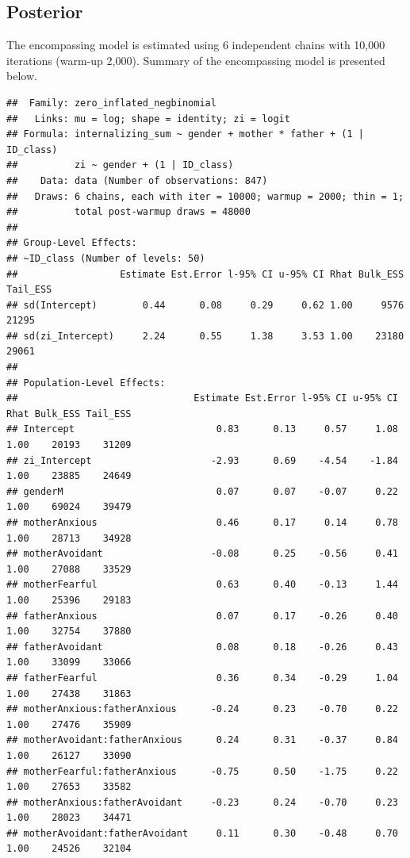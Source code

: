 \documentclass[
]{book}
\begin{document}
\hypertarget{posterior-1}{%
\subsection{Posterior}\label{posterior-1}}

The encompassing model is estimated using 6 independent chains with 10,000 iterations (warm-up 2,000). Summary of the encompassing model is presented below.

\begin{verbatim}
##  Family: zero_inflated_negbinomial 
##   Links: mu = log; shape = identity; zi = logit 
## Formula: internalizing_sum ~ gender + mother * father + (1 | ID_class) 
##          zi ~ gender + (1 | ID_class)
##    Data: data (Number of observations: 847) 
##   Draws: 6 chains, each with iter = 10000; warmup = 2000; thin = 1;
##          total post-warmup draws = 48000
## 
## Group-Level Effects: 
## ~ID_class (Number of levels: 50) 
##                  Estimate Est.Error l-95% CI u-95% CI Rhat Bulk_ESS Tail_ESS
## sd(Intercept)        0.44      0.08     0.29     0.62 1.00     9576    21295
## sd(zi_Intercept)     2.24      0.55     1.38     3.53 1.00    23180    29061
## 
## Population-Level Effects: 
##                               Estimate Est.Error l-95% CI u-95% CI Rhat Bulk_ESS Tail_ESS
## Intercept                         0.83      0.13     0.57     1.08 1.00    20193    31209
## zi_Intercept                     -2.93      0.69    -4.54    -1.84 1.00    23885    24649
## genderM                           0.07      0.07    -0.07     0.22 1.00    69024    39479
## motherAnxious                     0.46      0.17     0.14     0.78 1.00    28713    34928
## motherAvoidant                   -0.08      0.25    -0.56     0.41 1.00    27088    33529
## motherFearful                     0.63      0.40    -0.13     1.44 1.00    25396    29183
## fatherAnxious                     0.07      0.17    -0.26     0.40 1.00    32754    37880
## fatherAvoidant                    0.08      0.18    -0.26     0.43 1.00    33099    33066
## fatherFearful                     0.36      0.34    -0.29     1.04 1.00    27438    31863
## motherAnxious:fatherAnxious      -0.24      0.23    -0.70     0.22 1.00    27476    35909
## motherAvoidant:fatherAnxious      0.24      0.31    -0.37     0.84 1.00    26127    33090
## motherFearful:fatherAnxious      -0.75      0.50    -1.75     0.22 1.00    27653    33582
## motherAnxious:fatherAvoidant     -0.23      0.24    -0.70     0.23 1.00    28023    34471
## motherAvoidant:fatherAvoidant     0.11      0.30    -0.48     0.70 1.00    24526    32104

\end{verbatim}
\end{document}
